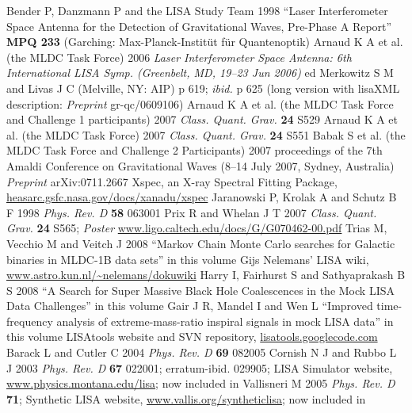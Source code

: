 \documentclass{iopart}
\begin{document}
\begin{thebibliography}{99}
%
 Bender P, Danzmann P and the LISA Study Team 1998 ``Laser Interferometer Space Antenna for the Detection of Gravitational Waves, Pre-Phase A Report'' \textbf{MPQ 233} (Garching: Max-Planck-Instit\"ut f\"ur Quantenoptik) 
%
 Arnaud K A et al. (the MLDC Task Force) 2006 \textit{Laser Interferometer Space Antenna: 6th International LISA Symp. (Greenbelt, MD, 19--23 Jun 2006)} ed Merkowitz S M and Livas J C (Melville, NY: AIP) p 619; \textit{ibid.} p 625 (long version with lisaXML description: \textit{Preprint} gr-qc/0609106)
%
 Arnaud K A et al. (the MLDC Task Force and Challenge 1 participants) 2007 \textit{Class. Quant. Grav.} \textbf{24} S529
%
 Arnaud K A et al. (the MLDC Task Force) 2007 \textit{Class. Quant. Grav.} \textbf{24} S551
%
 Babak S et al. (the MLDC Task Force and Challenge 2 Participants) 2007 proceedings of the 7th Amaldi Conference on Gravitational Waves (8--14 July 2007, Sydney, Australia) \textit{Preprint} arXiv:0711.2667
%
 Xspec, an X-ray Spectral Fitting Package, \url{heasarc.gsfc.nasa.gov/docs/xanadu/xspec}
%
 Jaranowski P, Krolak A and Schutz B F 1998 \textit{Phys. Rev. D} \textbf{58} 063001
%
 Prix R and Whelan J T 2007 \textit{Class. Quant. Grav.} \textbf{24} S565; \textit{Poster} \url{www.ligo.caltech.edu/docs/G/G070462-00.pdf}
%
 Trias M, Vecchio M and Veitch J 2008
``Markov Chain Monte Carlo searches for Galactic binaries in MLDC-1B data sets'' in this volume
%
 Gijs Nelemans' LISA wiki, \url{www.astro.kun.nl/~nelemans/dokuwiki}
%
 Harry I, Fairhurst S and Sathyaprakash B S 2008 ``A Search for Super Massive Black Hole Coalescences in the Mock LISA Data Challenges'' in this volume
%
 Gair J R, Mandel I and Wen L
``Improved time-frequency analysis of extreme-mass-ratio inspiral signals in mock LISA data'' in this volume
%
 LISAtools website and SVN repository, \url{lisatools.googlecode.com}
%
 Barack L and Cutler C 2004 \textit{Phys. Rev. D} \textbf{69} 082005
%
 Cornish N J and Rubbo L J 2003 \emph{Phys. Rev. D} \textbf{67} 022001; erratum-ibid. 029905; LISA Simulator website, \url{www.physics.montana.edu/lisa}; now included in \cite{lisatools}
%
 Vallisneri M 2005 \emph{Phys. Rev. D} \textbf{71}; Synthetic LISA website, \url{www.vallis.org/syntheticlisa}; now included in \cite{lisatools}

\end{thebibliography}
\end{document}
